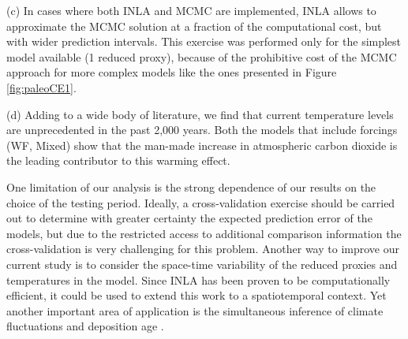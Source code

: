 \documentclass[12pt]{amsart}
\theoremstyle{plain}
\theoremstyle{definition}
\theoremstyle{remark}
\begin{document}
     \noindent (c) In cases where both INLA and MCMC are implemented, INLA allows to approximate the MCMC
      solution at a fraction of the computational cost, but with wider
      prediction intervals. This exercise was performed only for the simplest
      model available (1 reduced proxy), because of the prohibitive cost of the
      MCMC approach for more complex models like the ones presented in Figure
      \ref{fig:paleoCE1}. 
      
     \noindent (d) Adding to a wide body of literature, we find that current temperature levels are unprecedented in the past 2,000 years. Both the models that include forcings (WF, Mixed) show that the man-made increase in atmospheric carbon dioxide is the leading contributor to this warming effect. 

One limitation of our analysis is the strong
dependence of our results on the choice of the testing period. Ideally, a
cross-validation exercise should be carried out to determine with greater
certainty the expected prediction error of the models, but due to the restricted access to
additional comparison information the cross-validation is very challenging for this problem. 
Another way to improve our current study is to consider the space-time variability of the reduced proxies and temperatures in the model. 
Since INLA has been proven to be computationally
efficient, it could be used to extend this work to a spatiotemporal context. Yet another important area of application is the simultaneous inference of climate fluctuations and deposition age \citep{Sweeney:WIRES2018}.



\end{document}
